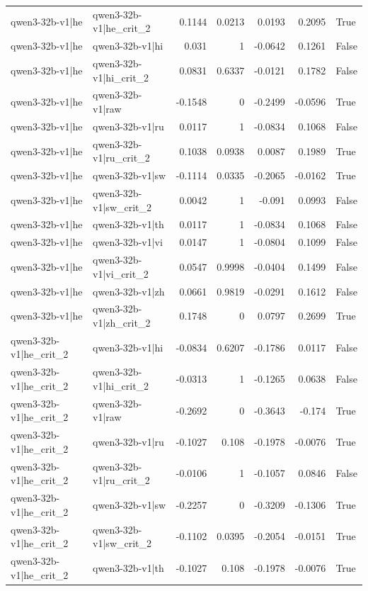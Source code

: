 \begin{table}
\begin{tabular}{l l r r r r l}
qwen3-32b-v1|he & qwen3-32b-v1|he_crit_2 & 0.1144 & 0.0213 & 0.0193 & 0.2095 & True \\
qwen3-32b-v1|he & qwen3-32b-v1|hi & 0.031 & 1 & -0.0642 & 0.1261 & False \\
qwen3-32b-v1|he & qwen3-32b-v1|hi_crit_2 & 0.0831 & 0.6337 & -0.0121 & 0.1782 & False \\
qwen3-32b-v1|he & qwen3-32b-v1|raw & -0.1548 & 0 & -0.2499 & -0.0596 & True \\
qwen3-32b-v1|he & qwen3-32b-v1|ru & 0.0117 & 1 & -0.0834 & 0.1068 & False \\
qwen3-32b-v1|he & qwen3-32b-v1|ru_crit_2 & 0.1038 & 0.0938 & 0.0087 & 0.1989 & True \\
qwen3-32b-v1|he & qwen3-32b-v1|sw & -0.1114 & 0.0335 & -0.2065 & -0.0162 & True \\
qwen3-32b-v1|he & qwen3-32b-v1|sw_crit_2 & 0.0042 & 1 & -0.091 & 0.0993 & False \\
qwen3-32b-v1|he & qwen3-32b-v1|th & 0.0117 & 1 & -0.0834 & 0.1068 & False \\
qwen3-32b-v1|he & qwen3-32b-v1|vi & 0.0147 & 1 & -0.0804 & 0.1099 & False \\
qwen3-32b-v1|he & qwen3-32b-v1|vi_crit_2 & 0.0547 & 0.9998 & -0.0404 & 0.1499 & False \\
qwen3-32b-v1|he & qwen3-32b-v1|zh & 0.0661 & 0.9819 & -0.0291 & 0.1612 & False \\
qwen3-32b-v1|he & qwen3-32b-v1|zh_crit_2 & 0.1748 & 0 & 0.0797 & 0.2699 & True \\
qwen3-32b-v1|he_crit_2 & qwen3-32b-v1|hi & -0.0834 & 0.6207 & -0.1786 & 0.0117 & False \\
qwen3-32b-v1|he_crit_2 & qwen3-32b-v1|hi_crit_2 & -0.0313 & 1 & -0.1265 & 0.0638 & False \\
qwen3-32b-v1|he_crit_2 & qwen3-32b-v1|raw & -0.2692 & 0 & -0.3643 & -0.174 & True \\
qwen3-32b-v1|he_crit_2 & qwen3-32b-v1|ru & -0.1027 & 0.108 & -0.1978 & -0.0076 & True \\
qwen3-32b-v1|he_crit_2 & qwen3-32b-v1|ru_crit_2 & -0.0106 & 1 & -0.1057 & 0.0846 & False \\
qwen3-32b-v1|he_crit_2 & qwen3-32b-v1|sw & -0.2257 & 0 & -0.3209 & -0.1306 & True \\
qwen3-32b-v1|he_crit_2 & qwen3-32b-v1|sw_crit_2 & -0.1102 & 0.0395 & -0.2054 & -0.0151 & True \\
qwen3-32b-v1|he_crit_2 & qwen3-32b-v1|th & -0.1027 & 0.108 & -0.1978 & -0.0076 & True \\

\end{tabular}
\end{table}
